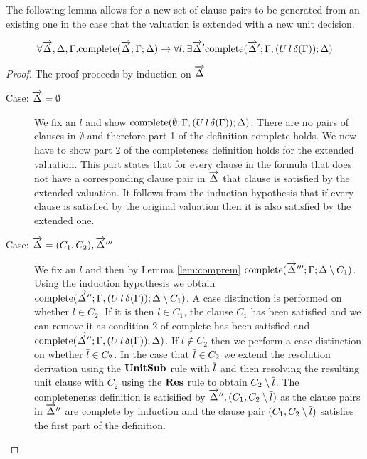 The following lemma allows for a new set of clause pairs to be generated from an existing one in the case that the valuation is extended with a new unit decision.

\begin{mylemma}\label{lem:compunit}
\begin{align*}\forall \overrightarrow{\Delta},\Delta,\Gamma.  \mathrm{complete}(\overrightarrow{\Delta};\Gamma; \Delta) \to \forall l. \, \exists \overrightarrow{\Delta}' \mathrm{complete}(\overrightarrow{\Delta}';\Gamma, (U \, l \, \delta(\Gamma)); \Delta)
\end{align*}
\begin{proof}
The proof proceeds by induction on $\overrightarrow{\Delta}$
\begin{description}
\item[Case: $\overrightarrow{\Delta} = \emptyset$] 
We fix an $l$ and show $\mathrm{complete}(\emptyset;\Gamma, (U \, l \, \delta(\Gamma)); \Delta)$.  There are no pairs of clauses in $\emptyset$ and therefore part 1 of the definition $\mathrm{complete}$ holds. We now have to show part 2 of the completeness definition holds for the extended valuation. This part states that for every clause in the formula that does not have a corresponding clause pair in $\overrightarrow{\Delta}$ that clause is satisfied by the extended valuation.  It follows from the induction hypothesis that if every clause is satisfied by the original valuation then it is also satisfied by the extended one.
\item[Case: $\overrightarrow{\Delta} = (C_1, C_2), \overrightarrow{\Delta}'''$] We fix an $l$ and then by Lemma \ref{lem:comprem} $\mathrm{complete}(\overrightarrow{\Delta}''';\Gamma; \Delta \setminus C_1)$. Using the induction hypothesis we obtain $\mathrm{complete}(\overrightarrow{\Delta}'';\Gamma, (U \, l \, \delta(\Gamma)); \Delta \setminus C_1)$. A case distinction is performed on whether $l \in C_2$. If it is then $l \in C_1$, the clause $C_1$ has been satisfied and we can remove it as condition 2 of $\mathrm{complete}$ has been satisfied and $\mathrm{complete}(\overrightarrow{\Delta}'';\Gamma, (U \, l \, \delta(\Gamma)); \Delta)$. If $l \notin C_2$ then we perform a case distinction on whether $\overline{l} \in C_2$. In the case that $\overline{l} \in C_2$ we extend the resolution derivation using the $\mathbf{UnitSub}$ rule with $\overline{l}$ and then resolving the resulting unit clause with $C_2$ using the $\mathbf{Res}$ rule to obtain $C_2 \setminus \overline{l}$. The completenenss definition is satisified by $\overrightarrow{\Delta}'',(C_1, C_2 \setminus \overline{l})$ as the clause pairs in $\overrightarrow{\Delta}''$ are complete by induction and the clause pair $(C_1, C_2 \setminus \overline{l})$ satisfies the first part of the definition. 
\end{description}
\end{proof}
\end{mylemma}


